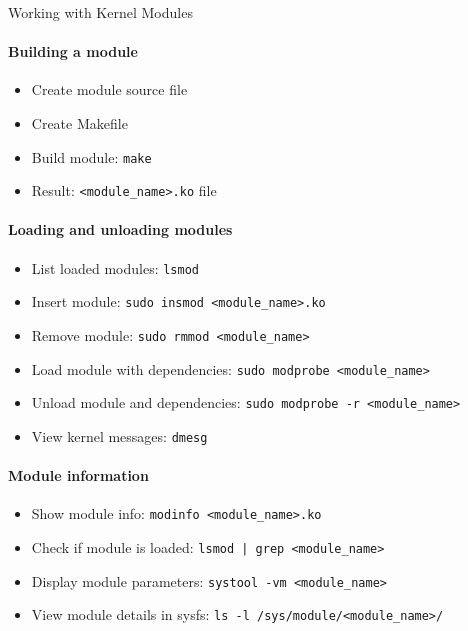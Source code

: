 \begin{KR}{Working with Kernel Modules}\\
    \paragraph{Building a module}
    \begin{itemize}
        \item Create module source file
        \item Create Makefile
        \item Build module: \texttt{make}
        \item Result: \texttt{<module\_name>.ko} file
    \end{itemize}
    
    \paragraph{Loading and unloading modules}
    \begin{itemize}
        \item List loaded modules: \texttt{lsmod}
        \item Insert module: \texttt{sudo insmod <module\_name>.ko}
        \item Remove module: \texttt{sudo rmmod <module\_name>}
        \item Load module with dependencies: \texttt{sudo modprobe <module\_name>}
        \item Unload module and dependencies: \texttt{sudo modprobe -r <module\_name>}
        \item View kernel messages: \texttt{dmesg}
    \end{itemize}
    
    \paragraph{Module information}
    \begin{itemize}
        \item Show module info: \texttt{modinfo <module\_name>.ko}
        \item Check if module is loaded: \texttt{lsmod | grep <module\_name>}
        \item Display module parameters: \texttt{systool -vm <module\_name>}
        \item View module details in sysfs: \texttt{ls -l /sys/module/<module\_name>/}
    \end{itemize}
    

\end{KR}
